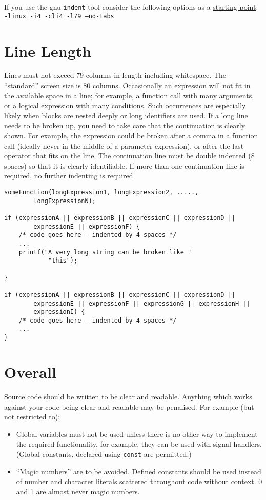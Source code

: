 \documentclass{article}
\begin{document}
If you use the gnu \texttt{indent} tool consider the following options as a \underline{starting point}:\\
\texttt{-linux -i4 -cli4 -l79 --no-tabs}

\section{Line Length}
Lines must not exceed 79 columns in length including whitespace.
The ``standard'' screen size is 80 columns.
Occasionally an expression will not fit in the available space in a line; for example, a function call with many arguments, or a logical expression with many conditions.
Such occurrences are especially likely when blocks are nested deeply or long identifiers are used.
If a long line needs to be broken up, you need to take care that the continuation is clearly shown.
For example, the expression could be broken after a comma in a function call (ideally never in the middle of a parameter expression), or after the last operator that fits on the line.
The continuation line must be double indented (8 spaces) so that it is clearly identifiable.
If more than one continuation line is required, no further indenting is required.

\begin{lstlisting}
someFunction(longExpression1, longExpression2, .....,
        longExpressionN);

if (expressionA || expressionB || expressionC || expressionD ||
        expressionE || expressionF) {
    /* code goes here - indented by 4 spaces */
    ...
    printf("A very long string can be broken like "
            "this");

}

if (expressionA || expressionB || expressionC || expressionD ||
        expressionE || expressionF || expressionG || expressionH ||
        expressionI) {
    /* code goes here - indented by 4 spaces */
    ...
}
\end{lstlisting}

\section{Overall}
\label{sec:overall}
Source code should be written to be clear and readable.
Anything which works against your code being clear and readable may be penalised.
For example (but not restricted to):
\begin{itemize}
\item Global variables must not be used unless there is no other way to implement the required functionality, for example, 
they can be used with signal handlers. (Global constants, declared using \texttt{const} are permitted.)
\item ``Magic numbers'' are to be avoided. Defined constants should be used instead of number and character literals scattered throughout code without context. 0 and 1 are almost never magic numbers.
\end{itemize}
\end{document}
